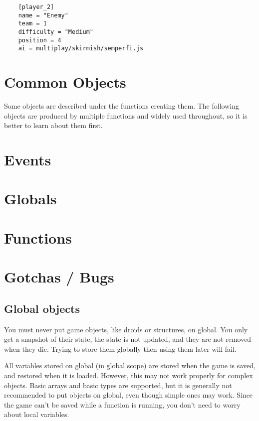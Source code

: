 \documentclass[12pt]{article}
\begin{document}
\begin{verbatim}
	[player_2]
	name = "Enemy"
	team = 1
	difficulty = "Medium"
	position = 4
	ai = multiplay/skirmish/semperfi.js
\end{verbatim}

\section{Common Objects}

Some objects are described under the functions creating them. The following objects are produced by
multiple functions and widely used throughout, so it is better to learn about them first.



\section{Events}



\section{Globals}

\begin{description}

\end{description}

\section{Functions}



\section{Gotchas / Bugs}

\subsection{Global objects}
You must never put game objects, like droids or structures, on global. You only get a snapshot of their state,
the state is not updated, and they are not removed when they die. Trying to store them globally then using them 
later will fail.

All variables stored on global (in global scope) are stored when the game is saved, and restored when it is 
loaded. However, this may not work properly for complex objects. Basic arrays and basic types are supported,
but it is generally not recommended to put objects on global, even though simple ones may work. Since the game
can't be saved while a function is running, you don't need to worry about local variables.
\end{document}
